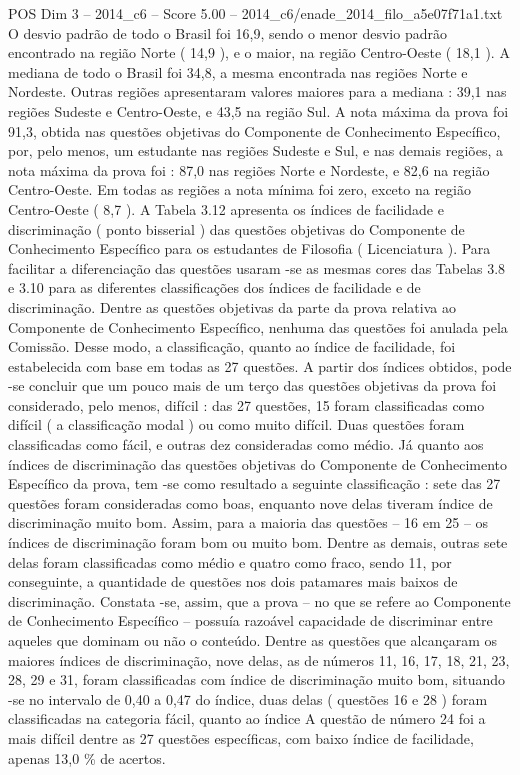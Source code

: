 \begin{textsample}{POS Dim 3 – 2014\_c6 – Score 5.00 – 2014\_c6/enade\_2014\_filo\_a5e07f71a1.txt}
O desvio padrão de todo o Brasil foi 16,9, sendo o menor desvio padrão encontrado na região Norte ( 14,9 ), e o maior, na região Centro-Oeste ( 18,1 ).
A mediana de todo o Brasil foi 34,8, a mesma encontrada nas regiões Norte e Nordeste.
Outras regiões apresentaram valores maiores para a mediana : 39,1 nas regiões Sudeste e Centro-Oeste, e 43,5 na região Sul.
A nota máxima da prova foi 91,3, obtida nas questões objetivas do Componente de Conhecimento Específico, por, pelo menos, um estudante nas regiões Sudeste e Sul, e nas demais regiões, a nota máxima da prova foi : 87,0 nas regiões Norte e Nordeste, e 82,6 na região Centro-Oeste.
Em todas as regiões a nota mínima foi zero, exceto na região Centro-Oeste ( 8,7 ).
A Tabela 3.12 apresenta os índices de facilidade e discriminação ( ponto bisserial ) das questões objetivas do Componente de Conhecimento Específico para os estudantes de Filosofia ( Licenciatura ).
Para facilitar a diferenciação das questões usaram -se as mesmas cores das Tabelas 3.8 e 3.10 para as diferentes classificações dos índices de facilidade e de discriminação.
Dentre as questões objetivas da parte da prova relativa ao Componente de Conhecimento Específico, nenhuma das questões foi anulada pela Comissão.
Desse modo, a classificação, quanto ao índice de facilidade, foi estabelecida com base em todas as 27 questões.
A partir dos índices obtidos, pode -se concluir que um pouco mais de um terço das questões objetivas da prova foi considerado, pelo menos, difícil : das 27 questões, 15 foram classificadas como difícil ( a classificação modal ) ou como muito difícil.
Duas questões foram classificadas como fácil, e outras dez consideradas como médio.
Já quanto aos índices de discriminação das questões objetivas do Componente de Conhecimento Específico da prova, tem -se como resultado a seguinte classificação : sete das 27 questões foram consideradas como boas, enquanto nove delas tiveram índice de discriminação muito bom.
Assim, para a maioria das questões – 16 em 25 – os índices de discriminação foram bom ou muito bom.
Dentre as demais, outras sete delas foram classificadas como médio e quatro como fraco, sendo 11, por conseguinte, a quantidade de questões nos dois patamares mais baixos de discriminação.
Constata -se, assim, que a prova – no que se refere ao Componente de Conhecimento Específico – possuía razoável capacidade de discriminar entre aqueles que dominam ou não o conteúdo.
Dentre as questões que alcançaram os maiores índices de discriminação, nove delas, as de números 11, 16, 17, 18, 21, 23, 28, 29 e 31, foram classificadas com índice de discriminação muito bom, situando -se no intervalo de 0,40 a 0,47 do índice, duas delas ( questões 16 e 28 ) foram classificadas na categoria fácil, quanto ao índice A questão de número 24 foi a mais difícil dentre as 27 questões específicas, com baixo índice de facilidade, apenas 13,0 \% de acertos.

\end{textsample}
